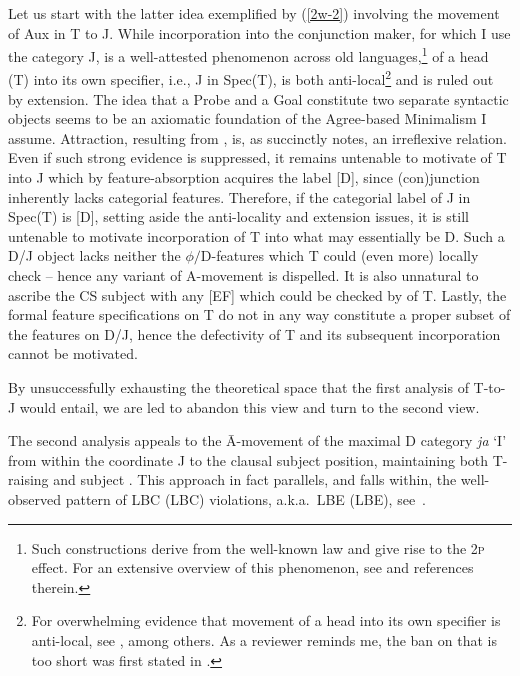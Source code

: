\documentclass[output=paper]{langsci/langscibook}
\begin{document}
Let us start with the latter idea exemplified by (\ref{2w-2}) involving the
movement of Aux in  T to J. While
incorporation into the conjunction maker, for which I use the category
J, is a well-attested phenomenon across old 
languages,\footnote{Such constructions derive from the well-known
 law and give rise to the \textsc{2p} effect. For
an extensive overview of this phenomenon, see \citet{Mitrovic:2014phd} and
references therein.}  of a head (T) into its own
specifier, i.e., J in Spec(T), is both
anti-local\footnote{\label{anti-loc}For overwhelming evidence that movement of
    a head into its own specifier is anti-local, see
    \citet{SaitoKeiko:1999,Abels:2003a,Grohmann:2003a,Doggett:2004,Boskovic:2005,Boeckx:2007b},
among others. As a reviewer reminds me, the ban on  that is too
short was first stated in \citet{Boskovic:1994}.} and is ruled out by
extension. The idea that a Probe and a Goal constitute two separate syntactic
objects seems to be an axiomatic foundation of the Agree-based Minimalism I
assume. Attraction, resulting from , is, as
\citet[397]{roberts:2012uq} succinctly notes, an irreflexive relation. Even if
such strong evidence is suppressed, it remains untenable to motivate
 of T into J which by feature-absorption
acquires the label [D], since (con)junction inherently lacks categorial
features. Therefore, if the categorial label of J in Spec(T)
is [D], setting aside the anti-locality and extension issues, it is still
untenable to motivate incorporation of T into what may essentially be
D.  Such a D/J object lacks neither the
$\phi/$D-features which T could (even more) locally
check -- hence any variant of A-movement is dispelled. It is also unnatural to
ascribe the CS subject with any [\gls{EF}] which could be checked by
 of T. Lastly, the formal feature specifications on
T do not in any way constitute a proper subset of the features on
D/J, hence the defectivity of T and its subsequent
incorporation cannot be motivated.

By unsuccessfully exhausting the theoretical space that the first analysis of
T-to-J  would entail, we are led to abandon this view and turn to
the second view.

The second analysis appeals to the Ā-movement of the maximal D category
\emph{ja} `I' from within the coordinate J to the
clausal subject position, maintaining both T-raising and subject . This
approach in fact parallels, and falls within, the well-observed pattern of
\glsdesc{LBC} (\gls{LBC}) violations, a.k.a.\ \glsdesc{LBE} (\gls{LBE}),
see~.
\end{document}
